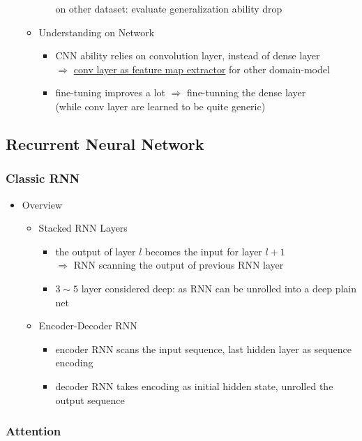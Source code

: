 \begin{itemize}
\begin{itemize}
\begin{itemize}
		on other dataset: evaluate generalization ability drop
		\end{itemize}
	\item Understanding on Network
		\begin{itemize}
		\item CNN ability relies on convolution layer, instead of dense layer \\
		$\Rightarrow$ \underline{conv layer as feature map extractor} for other domain-model
		\item fine-tuning improves a lot $\Rightarrow$ fine-tunning the dense layer \\
		(while conv layer are learned to be quite generic)
		\end{itemize}
	\end{itemize}
\end{itemize}


\subsection{Recurrent Neural Network}
\subsubsection{Classic RNN}
\begin{itemize}
\item Overview
	\begin{itemize}
	\item Stacked RNN Layers
		\begin{itemize}
		\item the output of layer $l$ becomes the input for layer $l+1$ \\
		$\Rightarrow$ RNN scanning the output of previous RNN layer
		\item $3\sim5$ layer considered deep: as RNN can be unrolled into a deep plain net
		\end{itemize}
	\item Encoder-Decoder RNN
		\begin{itemize}
		\item encoder RNN scans the input sequence, last hidden layer as sequence encoding
		\item decoder RNN takes encoding as initial hidden state, unrolled the output sequence
		\end{itemize}
	\end{itemize}
\end{itemize}

\subsubsection{Attention}

